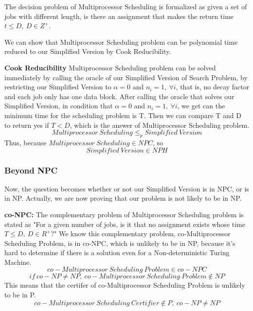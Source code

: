 \documentclass{article}
\begin{document}
The decision problem of Multiprocessor Scheduling is formalized as given a set of jobs with different length, is there an assignment that makes the return time $t \leq D,\ D \in Z^{+}$.

We can show that Multiprocessor Scheduling problem can be polynomial time reduced to our Simplified Version by Cook Reducibility.

\textbf{Cook Reducibility} Multiprocessor Scheduling problem can be solved immediately by calling the oracle of our Simplified Version of Search Problem, by restricting our Simplified Version to $\alpha = 0$ and $ n_i = 1,\ \forall i $, that is, no decay factor and each job only has one data block. After calling the oracle that solves our Simplified Version, in condition that $\alpha = 0$ and $ n_i = 1,\ \forall i $, we get can the minimum time for the scheduling problem is T. Then we can compare T and D to return yes if $T < D$, which is the answer of Multiprocessor Scheduling problem.
\begin{equation}
    Multiprocessor\ Scheduling \leq_p Simplified\ Version
\end{equation}
Thus, because $Multiprocessor\ Scheduling \in NPC$, so 
\begin{equation}
    Simplified\ Version \in NPH
\end{equation}

\subsubsection{Beyond NPC}
Now, the question becomes whether or not our Simplified Version is in NPC, or is in NP. Actually, we are now proving that our problem is not likely to be in NP.

\textbf{co-NPC:}
The complementary problem of Multiprocessor Scheduling problem is stated as "For a given number of jobs, is it that no assignment exists whose time $T \leq D,\ D \in R^{+}$?" We know this complementary problem, co-Multiprocessor Scheduling Problem, is in co-NPC, which is unlikely to be in NP, because it's hard to determine if there is a solution even for a Non-deterministic Turing Machine.
\begin{equation}
    co-Multiprocessor\ Scheduling\ Problem \in co-NPC
\end{equation}
\begin{equation}
    if\ co-NP \neq NP,\  co-Multiprocessor\ Scheduling\ Problem \notin NP
\end{equation}
This means that the certifer of co-Multiprocessor Scheduling Problem is unlikely to be in P.
\begin{equation}
    co-Multiprocessor\ Scheduling\ Certifier \notin P,\ co-NP \neq NP
    \label{co-NP1}
\end{equation}
\end{document}
